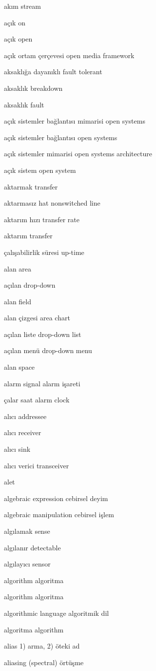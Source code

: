 \documentclass[12pt,fleqn]{article}\usepackage{../../common}
\begin{document}
akım stream

açık on

açık open

açık ortam çerçevesi open media framework

aksaklığa dayanıklı fault tolerant

aksaklık breakdown

aksaklık fault

açık sistemler bağlantısı mimarisi open systems

açık sistemler bağlantısı open systems

açık sistemler mimarisi open systems architecture

açık sistem open system

aktarmak transfer

aktarmasız hat nonswitched line

aktarım hızı transfer rate

aktarım transfer

çalışabilirlik süresi up-time

alan area

açılan drop-down

alan field

alan çizgesi area chart

açılan liste drop-down list

açılan menü drop-down menu

alan space

alarm signal alarm işareti

çalar saat alarm clock

alıcı addressee

alıcı receiver

alıcı sink

alıcı verici transceiver

alet

algebraic expression cebirsel deyim

algebraic manipulation cebirsel işlem

algılamak sense

algılanır detectable

algılayıcı sensor

algorithm algoritma

algorithm algoritma

algorithmic language algoritmik dil

algoritma algorithm

alias 1) arma, 2) öteki ad

aliasing (spectral) örtüşme
\end{document}
